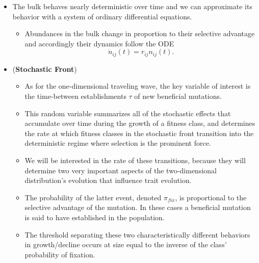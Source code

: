 \documentclass[11pt,one column]{article}
\begin{document}
\begin{itemize}
\item The bulk behaves nearly deterministic over time and we can approximate its behavior with a system of ordinary differential equations.
\begin{itemize}
\item Abundances in the bulk change in proportion to their selective advantage and accordingly their dynamics follow the ODE \[ \dot{n}_{ij}(t) = r_{ij} n_{ij}(t). \]
\end{itemize}

\item (\textbf{Stochastic Front})
\begin{itemize}
\item As for the one-dimensional traveling wave, the key variable of interest is the time-between establishments $\tau$ of new beneficial mutations. 
\item This random variable summarizes all of the stochastic effects that accumulate over time during the growth of a fitness class, and determines the rate at which fitness classes in the stochastic front transition into the deterministic regime where selection is the prominent force. 
\item We will be interested in the rate of these transitions, because they will determine two very important aspects of the two-dimensional distribution’s evolution that influence trait evolution. 
\item The probability of the latter event, denoted $\pi_{fix}$, is proportional to the selective advantage of the mutation. In these cases a beneficial mutation is said to have established in the population. 
\item The threshold separating these two characteristically different behaviors in growth/decline occurs at size equal to the inverse of the class' probability of fixation.
\end{itemize}


\end{itemize}
\end{document}
